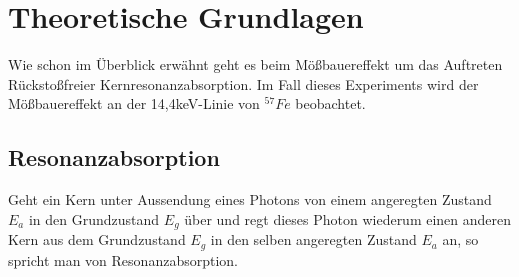 \documentclass[12pt]{article}
\begin{document}
\section{Theoretische Grundlagen}
Wie schon im Überblick erwähnt geht es beim Mößbauereffekt um das Auftreten Rückstoßfreier Kernresonanzabsorption.
Im Fall dieses Experiments wird der Mößbauereffekt an der 14,4keV-Linie von $^{57}Fe$ beobachtet. 

\subsection{Resonanzabsorption}
Geht ein Kern unter Aussendung eines Photons von einem angeregten Zustand $E_a$ in den Grundzustand $E_g$ über und regt dieses Photon
wiederum einen anderen Kern aus dem
Grundzustand $E_g$ in den selben angeregten Zustand $E_a$ an, so spricht man von Resonanzabsorption.
\end{document}
